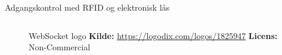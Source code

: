 \documentclass[aspectratio=169]{beamer}
\begin{document}
\begin{frame}{Adgangskontrol med RFID og elektronisk lås}
\begin{columns}
\begin{column}{0.4\textwidth}
\begin{columns}
		\end{columns}
		\begin{columns}
			\begin{column}{0.45\textwidth}
				\begin{figure}[height=0.2\textheight]
  					
  					\caption{WebSocket logo
  					\captionline \textbf{Kilde:} \url{https://logodix.com/logos/1825947}
  					\captionline \textbf{Licens:} Non-Commercial}
  					\label{fig:websocket-logo}
				\end{figure}
			\end{column}
		\end{columns}
	\end{column}
\end{columns}
\end{frame}
\end{document}
